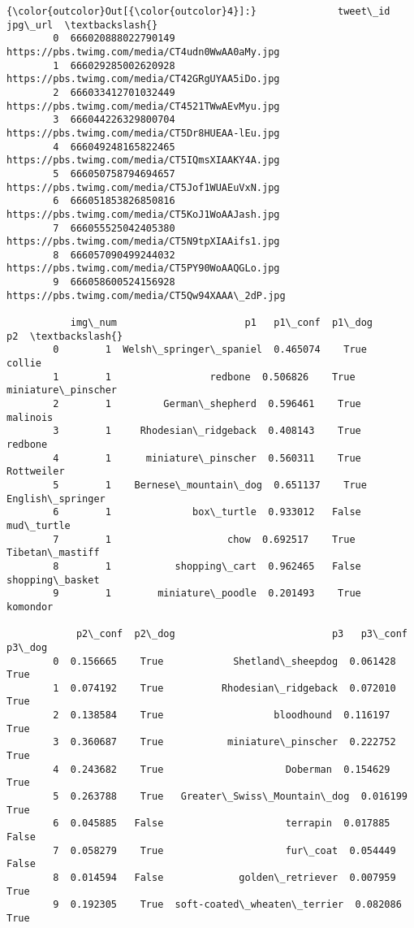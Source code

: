 \documentclass[11pt]{article}
\begin{document}
\begin{Verbatim}[commandchars=\\\{\}]
{\color{outcolor}Out[{\color{outcolor}4}]:}              tweet\_id                                          jpg\_url  \textbackslash{}
        0  666020888022790149  https://pbs.twimg.com/media/CT4udn0WwAA0aMy.jpg   
        1  666029285002620928  https://pbs.twimg.com/media/CT42GRgUYAA5iDo.jpg   
        2  666033412701032449  https://pbs.twimg.com/media/CT4521TWwAEvMyu.jpg   
        3  666044226329800704  https://pbs.twimg.com/media/CT5Dr8HUEAA-lEu.jpg   
        4  666049248165822465  https://pbs.twimg.com/media/CT5IQmsXIAAKY4A.jpg   
        5  666050758794694657  https://pbs.twimg.com/media/CT5Jof1WUAEuVxN.jpg   
        6  666051853826850816  https://pbs.twimg.com/media/CT5KoJ1WoAAJash.jpg   
        7  666055525042405380  https://pbs.twimg.com/media/CT5N9tpXIAAifs1.jpg   
        8  666057090499244032  https://pbs.twimg.com/media/CT5PY90WoAAQGLo.jpg   
        9  666058600524156928  https://pbs.twimg.com/media/CT5Qw94XAAA\_2dP.jpg   
        
           img\_num                      p1   p1\_conf  p1\_dog                  p2  \textbackslash{}
        0        1  Welsh\_springer\_spaniel  0.465074    True              collie   
        1        1                 redbone  0.506826    True  miniature\_pinscher   
        2        1         German\_shepherd  0.596461    True            malinois   
        3        1     Rhodesian\_ridgeback  0.408143    True             redbone   
        4        1      miniature\_pinscher  0.560311    True          Rottweiler   
        5        1    Bernese\_mountain\_dog  0.651137    True    English\_springer   
        6        1              box\_turtle  0.933012   False          mud\_turtle   
        7        1                    chow  0.692517    True     Tibetan\_mastiff   
        8        1           shopping\_cart  0.962465   False     shopping\_basket   
        9        1        miniature\_poodle  0.201493    True            komondor   
        
            p2\_conf  p2\_dog                           p3   p3\_conf  p3\_dog  
        0  0.156665    True            Shetland\_sheepdog  0.061428    True  
        1  0.074192    True          Rhodesian\_ridgeback  0.072010    True  
        2  0.138584    True                   bloodhound  0.116197    True  
        3  0.360687    True           miniature\_pinscher  0.222752    True  
        4  0.243682    True                     Doberman  0.154629    True  
        5  0.263788    True   Greater\_Swiss\_Mountain\_dog  0.016199    True  
        6  0.045885   False                     terrapin  0.017885   False  
        7  0.058279    True                     fur\_coat  0.054449   False  
        8  0.014594   False             golden\_retriever  0.007959    True  
        9  0.192305    True  soft-coated\_wheaten\_terrier  0.082086    True  
\end{Verbatim}
            
\end{document}
